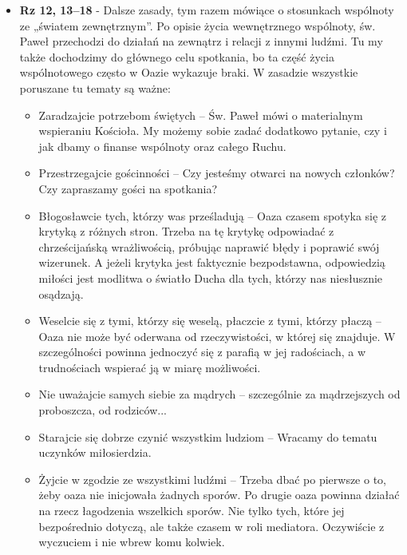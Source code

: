 \documentclass[a5paper,10pt,polish]{book}
\begin{document}
\begin{itemize}
\item {} 
\textbf{Rz 12, 13–18} -  Dalsze zasady, tym razem mówiące o stosunkach wspólnoty  ze „światem zewnętrznym”. Po opisie życia wewnętrznego wspólnoty, św. Paweł przechodzi do działań na zewnątrz i relacji z innymi ludźmi. Tu my także dochodzimy do głównego celu spotkania, bo ta część życia wspólnotowego  często w Oazie wykazuje braki. W  zasadzie wszystkie poruszane tu tematy  są ważne:
\begin{itemize}
\item {} 
Zaradzajcie potrzebom świętych – Św. Paweł mówi o materialnym wspieraniu Kościoła. My możemy sobie zadać dodatkowo pytanie, czy i jak dbamy o finanse wspólnoty oraz całego Ruchu.

\item {} 
Przestrzegajcie gościnności – Czy jesteśmy otwarci na nowych członków? Czy zapraszamy gości na spotkania?

\item {} 
Błogosławcie tych, którzy was prześladują  – Oaza czasem spotyka się z krytyką z różnych stron. Trzeba na tę krytykę odpowiadać z chrześcijańską wrażliwością, próbując naprawić błędy i poprawić swój  wizerunek. A jeżeli krytyka jest  faktycznie bezpodstawna, odpowiedzią miłości jest modlitwa o światło Ducha dla tych, którzy nas niesłusznie osądzają.

\item {} 
Weselcie się z tymi, którzy się weselą, płaczcie  z tymi, którzy płaczą – Oaza nie może być oderwana od rzeczywistości, w której się znajduje.  W szczególności powinna jednoczyć się z parafią w jej radościach, a w trudnościach wspierać ją w miarę możliwości.

\item {} 
Nie uważajcie  samych siebie za mądrych – szczególnie za mądrzejszych od proboszcza, od rodziców...

\item {} 
Starajcie się dobrze czynić wszystkim ludziom – Wracamy do tematu uczynków miłosierdzia.

\item {} 
Żyjcie w zgodzie ze wszystkimi  ludźmi – Trzeba dbać po pierwsze o to, żeby oaza nie inicjowała żadnych sporów. Po drugie oaza powinna działać na rzecz łagodzenia wszelkich sporów. Nie tylko tych, które jej bezpośrednio dotyczą, ale także czasem w roli mediatora. Oczywiście z wyczuciem i nie wbrew komu kolwiek.

\end{itemize}

\end{itemize}
\end{document}
